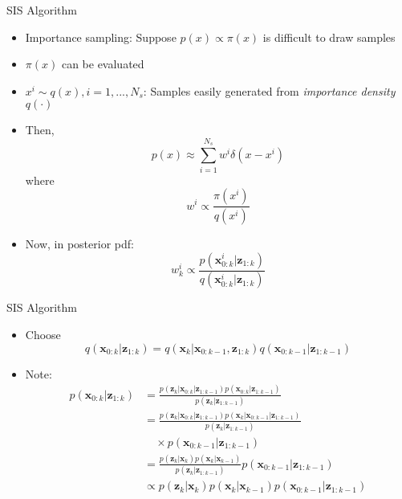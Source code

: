 \documentclass{beamer}
\newcommand{\x}{\mathbf{x}}
\newcommand{\z}{\mathbf{z}}
\begin{document}
\begin{frame}{SIS Algorithm}%
  \begin{itemize}
  		\item {Importance sampling: Suppose $p(x) \propto \pi(x)$ is difficult to draw samples
  		}
  		\item{$\pi(x)$ can be evaluated}
  		\item{$x^i \sim q(x), i = 1, ..., N_s$: Samples easily generated from \emph{importance density} $q(\cdot)$ 
  		}
   		\item{Then, 
    	$$
        	p(x) \approx \sum_{i=1}^{N_s} w^i\delta(x - x^i)
    	$$
    	where    
    	$$
       		 w^i \propto \frac{\pi(x^i)}{q(x^i)}
    	$$
        }
        \item{Now, in posterior pdf:
   		 $$
        	w_k^i \propto \frac{p(\x_{0:k}^{i}|\z_{1:k})}
        {q(\x_{0:k}^{i}|\z_{1:k})}   
    	$$
    	}
    \end{itemize}
\end{frame}

\begin{frame}{SIS Algorithm}%
  \begin{itemize}
  		\item{Choose 
    	$$
        	q(\x_{0:k}|\z_{1:k})=q(\x_k|\x_{0:k-1}, \z_{1:k})
        q(\x_{0:k-1}|\z_{1:k-1})
    	$$
		}
		\item{Note:
    		\begin{align*}
        		p(\x_{0:k}|\z_{1:k}) &= \frac{p(\z_k|\x_{0:k}|\z_{1:k-1})p(\x_{0:k}|\z_{1:k-1})}
            {p(\z_{k}|\z_{1:k-1})} \\
            &= \frac{p(\z_k|\x_{0:k}|\z_{1:k-1})p(\x_{k}|\x_{0:k-1}|\z_{1:k-1})}
            {p(\z_{k}|\z_{1:k-1})} \\
            & \quad \times p(\x_{0:k-1}|\z_{1:k-1}) \\
            &= \frac{p(\z_k|\x_k)p(\x_k|\x_{k-1})}
            {p(\z_k|\z_{1:k-1})}
            p(\x_{0:k-1}|\z_{1:k-1}) \\
            & \propto p(\z_k|\x_k)p(\x_k|\x_{k-1}) p(\x_{0:k-1}|\z_{1:k-1})
    		\end{align*}
    	}
  \end{itemize}
\end{frame} 
 
\end{document}
